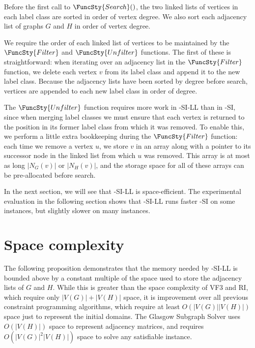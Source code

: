 Before the first call to $\FuncSty{Search}()$, the two linked lists of vertices in
each label class are sorted in order of vertex degree.  We also sort each adjacency list
of graphs $G$ and $H$ in order of vertex degree.

We require the order of each linked list of vertices to be maintained
by the $\FuncSty{Filter}$ and $\FuncSty{Unfilter}$ functions.  The first of these is straightforward:
when iterating over an adjacency list in the $\FuncSty{Filter}$ function, we delete each vertex $v$
from its label class and append it to the new label class.  Because the adjacency lists have been sorted
by degree before search, vertices are appended to each new label class in order of degree.

The $\FuncSty{Unfilter}$ function requires more work in \McSplit-SI-LL than in \McSplit-SI,
since when merging label classes we must ensure that each vertex is returned to the position
in its former label class from which it was removed.  To enable this, we perform a little extra
bookkeeping during the $\FuncSty{Filter}$ function: each time we remove a vertex $u$, we store
$v$ in an array along with a pointer to its successor node in the linked list from which $u$
was removed.  This array is at most as long $|N_G(v)|$ or $|N_H(v)|$, and the storage
space for all of these arrays can be pre-allocated before search.

In the next section, we will see that \McSplit-SI-LL is space-efficient.  The experimental evaluation
in the following section shows that \McSplit-SI-LL runs faster \McSplit-SI on some instances, but
slightly slower on many instances.

\FloatBarrier

\section{Space complexity}\label{sec:mcsplit-si-space-complexity}

The following proposition demonstrates that the memory needed by \McSplit-SI-LL
is bounded above by a constant multiple of the space used to store the adjacency
lists of $G$ and $H$.  While this is greater than the space complexity of 
VF3 and RI, which require only $|V(G)| + |V(H)|$ space, it is improvement
over all previous constraint programming algorithms, which
require at least $O(|V(G)| |V(H)|)$ space just to represent
the initial domains.  The Glasgow Subgraph Solver uses $O(|V(H)|)$ space
to represent adjacency matrices, and requires $O(|V(G)|^2|V(H)|)$ space
to solve any satisfiable instance.

